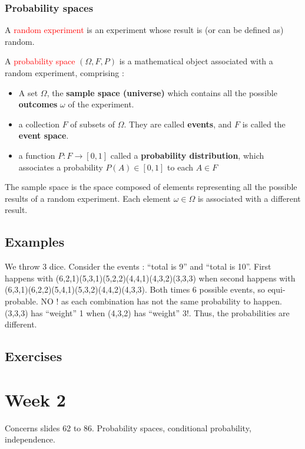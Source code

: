\documentclass[12pt,a4paper]{article}
\begin{document}
\subsubsection*{Probability spaces}
 A \textcolor{red}{random experiment} is an experiment whose result is (or can be defined as) random.

 A \textcolor{red}{probability space} $(\Omega, F, P)$ is a mathematical object associated with a random experiment, comprising :
\begin{itemize}
    \item A set $\Omega$, the \textbf{sample space (universe)} which contains all the possible \textbf{outcomes} $\omega$ of the experiment.
    \item a collection $F$ of subsets of $\Omega$. They are called \textbf{events}, and $F$ is called the \textbf{event space}.
    \item a function $P : F \to [0,1]$ called a \textbf{probability distribution}, which associates a probability $P(A) \in [0,1]$ to each $A \in F$
\end{itemize}
The sample space is the space composed of elements representing all the possible results of a random experiment. Each element $\omega \in \Omega$ is associated with a different result.

\subsection{Examples}
 We throw 3 dice. Consider the events : ``total is 9'' and ``total is 10''. First happens with (6,2,1)(5,3,1)(5,2,2)(4,4,1)(4,3,2)(3,3,3) when second happens with (6,3,1)(6,2,2)(5,4,1)(5,3,2)(4,4,2)(4,3,3). Both times 6 possible events, so equi-probable. NO ! as each combination has not the same probability to happen. (3,3,3) has ``weight'' 1 when (4,3,2) has ``weight'' 3!. Thus, the probabilities are different.
\subsection{Exercises}




\section{Week 2}
Concerns slides 62 to 86. Probability spaces, conditional probability, independence.
\end{document}
